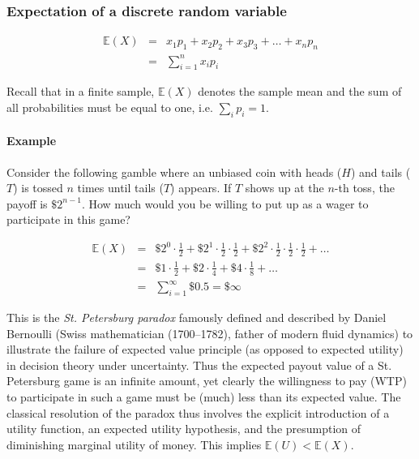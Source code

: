 \subsubsection{Expectation of a discrete random variable}
\begin{eqnarray}
\mathbb{E}(X) &=& x_{1}p_{1} + x_{2}p_{2} + x_{3}p_{3} +\ldots + x_{n}p_{n}\nonumber \\
&=& \sum^{n}_{i=1}x_{i}p_{i}
\end{eqnarray}

Recall that in a finite sample, $\mathbb{E}(X)$ denotes the sample mean and the sum of all probabilities must be equal to one, i.e. $\sum_{i}p_{i}=1$.

\paragraph{Example} Consider the following gamble where an unbiased coin with heads ($H$) and tails ($T$) is tossed $n$ times until tails ($T$) appears. If $T$ shows up at the $n$-th toss, the payoff is $\$2^{n-1}$. How much would you be willing to put up as a wager to participate in this game?

\begin{eqnarray*}
\mathbb{E}(X) &=& \$2^{0}\cdot\frac{1}{2} + \$2^{1}\cdot\frac{1}{2}\cdot\frac{1}{2} + \$2^{2}\cdot\frac{1}{2}\cdot\frac{1}{2}\cdot\frac{1}{2} + \ldots \\
&=& \$1\cdot\frac{1}{2} + \$2\cdot\frac{1}{4} + \$4\cdot\frac{1}{8} + \ldots\\
&=& \sum^{\infty}_{i=1}\$ 0.5 = \$\infty
\end{eqnarray*}

This is the \emph{St. Petersburg paradox} famously defined and described by Daniel Bernoulli (Swiss mathematician (1700--1782), father of modern fluid dynamics) to illustrate the failure of expected value principle (as opposed to expected utility) in decision theory under uncertainty. Thus the expected payout value of a St. Petersburg game is an infinite amount, yet clearly the willingness to pay (WTP) to participate in such a game must be (much) less than its expected value. The classical resolution of the paradox thus involves the explicit introduction of a utility function, an expected utility hypothesis, and the presumption of diminishing marginal utility of money. This implies $\mathbb{E}(U) < \mathbb{E}(X)$.

